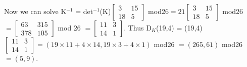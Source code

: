\documentclass[a4paper, 12pt]{report}
\begin{document}
Now we can solve K$^{-1}$ = det$^{-1}$(K)$
\begin{bmatrix}
	3 & 15\\
	18 & 5	
\end{bmatrix}$ mod26$ = 21
\begin{bmatrix}
	3 & 15\\
	18 & 5	
\end{bmatrix}$ mod26 $=
\begin{bmatrix}
	63 & 315\\
	378 & 105	
\end{bmatrix}$ mod 26 $=
\begin{bmatrix}
	11 & 3\\
	14 & 1	
\end{bmatrix}$. Thus D$_K$(19,4)  = (19,4)$
\begin{bmatrix}
	11 & 3\\
	14 & 1	
\end{bmatrix} = (19\times11+4\times14,19\times3+4\times1)$ mod26 $=(265,61)$ mod26 $=(5,9)$.
\end{document}
